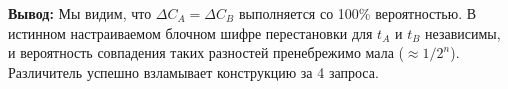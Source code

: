 \textbf{Вывод:} Мы видим, что \(\Delta C_A = \Delta C_B\) выполняется со 100\% вероятностью. В истинном настраиваемом блочном шифре перестановки для \(t_A\) и \(t_B\) независимы, и вероятность совпадения таких разностей пренебрежимо мала (\(\approx 1/2^n\)). Различитель успешно взламывает конструкцию за 4 запроса.
